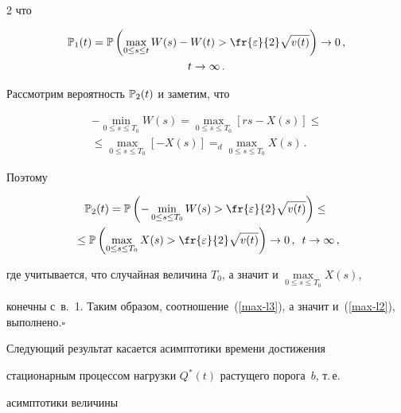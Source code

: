 \begin{multicols}{2}
что


\begin{multline*}


\Pu_1(t)=\Pu\left( \max\limits_{0 \leq s \leq t}W(s)-W(t)>


\fr{\varepsilon}{2}\sqrt{v(t)}  \right) \to 0\,,\\


 t \to \infty\,.


\end{multline*}


Рассмотрим  вероятность $\mathbb{P}_2(t)$ и заметим, что


\begin{multline*}


-\min\limits_{0 \leq s \leq T_0} W(s)=\max\limits_{0 \leq s \leq T_0 }[rs- X(s)]\leq{}\\


{}\leq \max\limits_{0 \leq s \leq T_0}[- X(s)]=_d  \max\limits_{0 \leq s \leq T_0}X(s)\,.


\end{multline*}


Поэтому


\begin{multline*}


\Pu_2(t) = \Pu\left( -\min\limits_{0 \leq s \leq T_0}W(s)>


\fr{\varepsilon}{2}\sqrt{v(t)} \right)\leq{}\\


{}\leq \Pu\left( \max\limits_{0 \leq s \leq T_0}X(s)>


\fr{\varepsilon}{2}\sqrt{v(t)}\right) \to 0\,,\enskip t \to \infty\,,


\end{multline*}


где учитывается, что  случайная величина  $T_0$, а значит и $\max\limits_{0\leq s \leq T_0}X(s)$, 


конечны с~в.~1. Таким образом, соотношение~(\ref{max-l3}), а значит и~(\ref{max-l2}), выполнено.\hfill$\square$





\smallskip





Следующий результат касается асимптотики времени достижения


стационарным процессом нагрузки $Q^*(t)$ растущего порога~$b$, т.\,е.\


асимптотики величины



\end{multicols}
